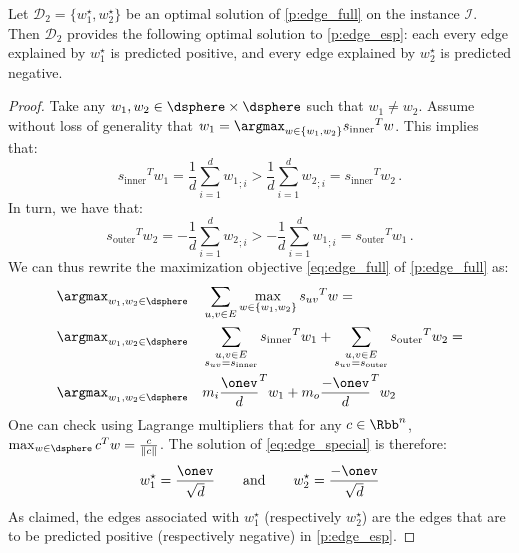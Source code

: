 \begin{prop}
  Let $\mathcal{D}_2 = \{w_1^\star, w_2^\star\}$ be an optimal solution of \autoref{p:edge_full} on the
  instance $\mathcal{I}$. Then $\mathcal{D}_2$ provides the following optimal solution to
  \autoref{p:edge_esp}: each every edge explained by $w_1^\star$ is predicted positive, and every
  edge explained by $w_2^\star$ is predicted negative.
\end{prop}
\begin{proof}
  Take any $w_1, w_2 \in \dsphere \times \dsphere$ such that $w_1 \neq w_2$. Assume without loss of
  generality that $w_1 = \argmax_{w\in \{w_1, w_2\}} {s_{\mathrm{inner}}}^T w$. This implies that:
  \begin{equation*}
    {s_{\mathrm{inner}}}^T w_1 = \frac{1}{d}\sum_{i=1}^d {w_1}_{;i} >
    \frac{1}{d}\sum_{i=1}^d {w_2}_{;i} = {s_{\mathrm{inner}}}^T w_2 \,.
  \end{equation*}
  In turn, we have that:
  \begin{equation*}
    {s_{\mathrm{outer}}}^T w_2 = -\frac{1}{d}\sum_{i=1}^d {w_2}_{;i} >
    -\frac{1}{d}\sum_{i=1}^d {w_1}_{;i} = {s_{\mathrm{outer}}}^T w_1 \,.
  \end{equation*}
  We can thus rewrite the maximization objective \eqref{eq:edge_full} of \autoref{p:edge_full} as:
  \begin{align}
    \label{eq:edge_special}
    \argmax_{w_1,w_2 \in \dsphere} & \quad \sum_{u,v \in E} \max_{w \in \{w_1, w_2\}} {s_{uv}}^T w = \\
    \argmax_{w_1,w_2 \in \dsphere} & \quad
    \sum_{\substack{u,v \in E\\ s_{uv} = s_{\mathrm{inner}}}} {s_{\mathrm{inner}}}^T w_1 +
    \sum_{\substack{u,v \in E\\ s_{uv} = s_{\mathrm{outer}}}} {s_{\mathrm{outer}}}^T w_2 = \notag \\
    \argmax_{w_1,w_2 \in \dsphere} & \quad m_i {\frac{\onev}{d}}^T w_1  + m_o {\frac{-\onev}{d}} ^T w_2 \notag
  \end{align}
  One can check using Lagrange multipliers that for any $c \in \Rbb^n$, $\max_{w \in \dsphere} c^T w
  = \frac{c}{\|c\|}$. The solution of \eqref{eq:edge_special} is therefore:
  \begin{equation*}
    w_1^\star = \frac{\onev}{\sqrt{d}} \qquad \text{and} \qquad w_2^\star = \frac{-\onev}{\sqrt{d}}
  \end{equation*}
  As claimed, the edges associated with $w_1^\star$ (respectively $w_2^\star$) are the edges that
  are to be predicted positive (respectively negative) in \autoref{p:edge_esp}.
\end{proof}

